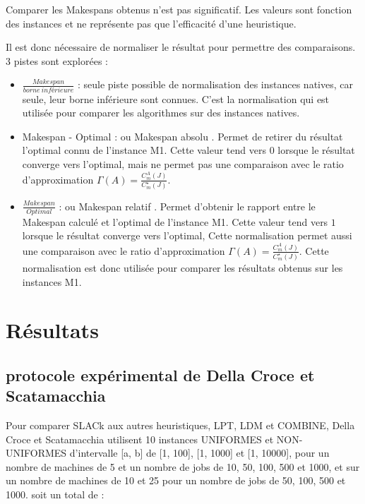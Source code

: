 \documentclass[a4paper,12pt]{report}
\theoremstyle{plain}				%
\theoremstyle{definition}				%
\begin{document}
Comparer les Makespans obtenus n'est pas significatif. Les valeurs sont fonction des instances et ne représente pas que l'efficacité d'une heuristique.

Il est donc nécessaire de normaliser le résultat pour permettre des comparaisons. 3 pistes sont explorées :
\begin{itemize}

  \item $\frac{Makespan}{borne~inférieure}$ : seule piste possible de normalisation 
  des instances natives, car seule, leur borne inférieure sont connues. 
  C'est la normalisation qui est utilisée pour comparer les algorithmes sur 
  des instances natives.
  
  \item Makespan - Optimal : ou Makespan absolu \cite{benoit2021update}. 
  Permet de retirer du résultat l'optimal connu de l'instance M1.
  Cette valeur tend vers $0$ lorsque le résultat converge vers l'optimal, 
  mais ne permet pas une comparaison avec 
  le ratio d'approximation $\Gamma(A)=\frac{C_m^A(J)}{C_m^\star(J)}$.

  \item $\frac{Makespan}{Optimal}$ : ou Makespan relatif \cite{benoit2021update}.
  Permet d'obtenir le rapport entre le Makespan calculé et l'optimal de l'instance M1.
  Cette valeur tend vers $1$ lorsque le résultat converge vers l'optimal, 
  Cette normalisation permet aussi une comparaison avec  
  le ratio d'approximation $\Gamma(A)=\frac{C_m^A(J)}{C_m^\star(J)}$. 
  Cette normalisation est donc utilisée pour comparer les résultats obtenus sur les instances 
  M1.
\end{itemize}


\section{Résultats} \label{sec:resultats}

\subsection{protocole expérimental de Della Croce et Scatamacchia}
\label{ssec:resultatsPrtocoleExperimentalDellaCroceScatamacchia}
 
Pour comparer SLACk aux autres heuristiques, LPT, LDM et COMBINE, Della Croce et Scatamacchia 
 utilisent 10 instances UNIFORMES et NON-UNIFORMES d'intervalle [a, b] de [1, 100], [1, 1000] et [1, 10000], pour un nombre de machines de 5 et un nombre de jobs de 10, 50, 100, 500 et 1000, et sur un nombre de machines de 10 et 25 pour un nombre de jobs de 50, 100, 500 et 1000.
soit un total de : 
\end{document}
